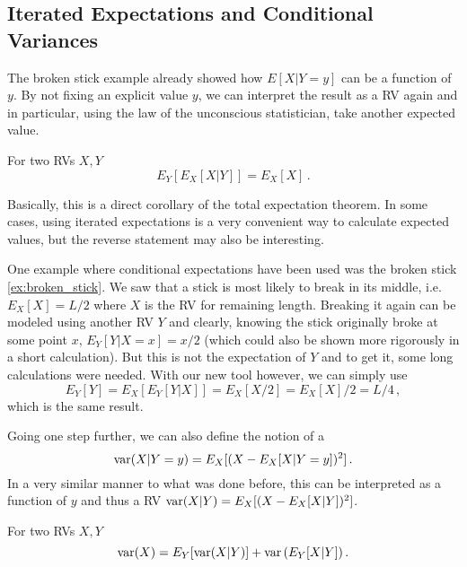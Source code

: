 	\subsection{Iterated Expectations and Conditional Variances}
The broken stick example already showed how $E[X | Y = y]$ can be a function of $y$. By not fixing an explicit value $y$, we can interpret the result as a RV again and in particular, using the law of the unconscious statistician, take another expected value.
\begin{prop}
For two RVs $X, Y$
\begin{equation}
E_Y[E_X[X | Y]] = E_X[X] \,. 
\end{equation}
\end{prop}
Basically, this is a direct corollary of the total expectation theorem. In some cases, using iterated expectations is a very convenient way to calculate expected values, but the reverse statement may also be interesting.


\begin{ex}
One example where conditional expectations have been used was the broken stick \ref{ex:broken_stick}. We saw that a stick is most likely to break in its middle, i.e.~$E_X[X] = L / 2$ where $X$ is the RV for remaining length. Breaking it again can be modeled using another RV $Y$ and clearly, knowing the stick originally broke at some point $x$, $E_Y[Y | X = x] = x / 2$ (which could also be shown more rigorously in a short calculation). But this is not the expectation of $Y$ and to get it, some long calculations were needed. With our new tool however, we can simply use
\begin{equation*}
E_Y[Y] = E_X[E_Y[Y | X]] = E_X[X / 2] = E_X[X] / 2 = L / 4 \, ,
\end{equation*}
which is the same result.
\end{ex}


Going one step further, we can also define the notion of a 
\begin{equation}
\operatorname{var}(X | Y = y) = E_X[(X - E_X[X | Y = y])^2] \, .
\end{equation}
In a very similar manner to what was done before, this can be interpreted as a function of $y$ and thus a RV $\operatorname{var}(X | Y) = E_X[(X - E_X[X | Y])^2]$.
\begin{prop}
For two RVs $X, Y$
\begin{equation}
\operatorname{var}(X) = E_Y\qty[\operatorname{var}(X | Y)] + \operatorname{var}\qty(E_Y[X | Y]) \, .
\end{equation}
\end{prop}




